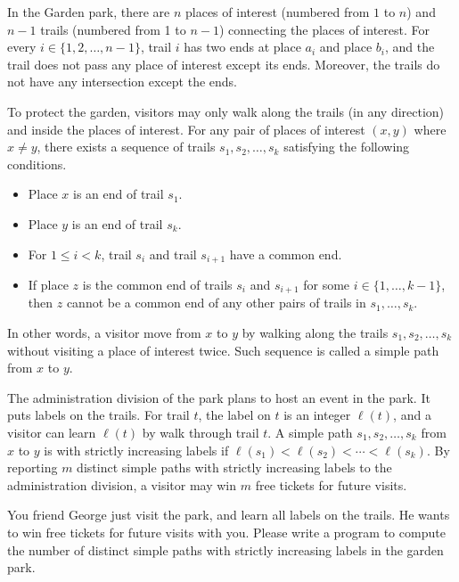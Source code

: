 In the Garden park, there are $n$ places of interest (numbered from $1$ to $n$)
and $n-1$ trails (numbered from 1 to $n-1$) connecting the places of interest. 
For every $i\in\{1,2,\dots,n-1\}$, trail $i$ has two ends at place $a_i$ and 
place $b_i$, and the trail does not pass any place of interest except its ends. 
Moreover, the trails do not have any intersection except the ends.

To protect the garden, visitors may only walk along the trails 
(in any direction)
and inside the places of interest. For any pair of places
of interest $(x, y)$ where $x\neq y$, 
there exists a sequence of trails $s_1,s_2,\dots,s_k$
satisfying the following conditions.
\begin{itemize}
\item Place $x$ is an end of trail $s_1$.
\item Place $y$ is an end of trail $s_k$.
\item For $1\le i < k$, trail $s_i$ and trail $s_{i+1}$ have a common end.
\item If place $z$ is the common end of trails $s_i$ and $s_{i+1}$ for some
$i\in\{1,\dots,k-1\}$, then $z$ cannot be a common end of any other pairs of 
trails in $s_1,\dots,s_k$.
\end{itemize}
In other words, a visitor move from $x$ to $y$ by walking along the trails
$s_1,s_2,\dots,s_k$ without visiting a place of interest twice. 
Such sequence is called a simple path from $x$ to $y$.

The administration division of the park plans to host an event in the park.
It puts labels on the trails. For trail $t$, the label on $t$ is an
integer $\ell(t)$, and a visitor can learn $\ell(t)$ by walk through 
trail $t$.
A simple path $s_1,s_2,\dots,s_k$ from $x$ to $y$ is 
with strictly increasing labels if $\ell(s_1)<\ell(s_2)<\cdots<\ell(s_k)$.
By reporting $m$ distinct simple paths with 
strictly increasing labels to the administration division, 
a visitor may win $m$ free tickets for future visits.

You friend George just visit the park, and learn all labels on the trails.
He wants to win free tickets for future visits with you.
Please write a program to compute the number of distinct simple paths 
with strictly increasing labels in
the garden park.

